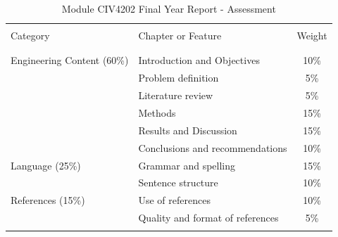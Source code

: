 \begin{table}
	\begin{center}
		\caption{\label{tbl:ModuleWeight}Module CIV4202 Final Year Report - Assessment}
		\begin{tabular}{llc}
			\hline \\
			Category                   & Chapter or Feature               & Weight \\
			\\
			\hline \\
			Engineering Content (60\%) & Introduction and Objectives      & 10\%   \\
			& Problem definition               & 5\%    \\
			& Literature review                & 5\%    \\
			& Methods                          & 15\%   \\
			& Results and Discussion           & 15\%   \\
			& Conclusions and recommendations  & 10\%   \\
			Language (25\%)            & Grammar and spelling             & 15\%   \\
			& Sentence structure               & 10\%   \\
			References (15\%)          & Use of references                & 10\%   \\
			& Quality and format of references & 5\%    \\
			\hline \\    
		\end{tabular}
	\end{center}
\end{table}

